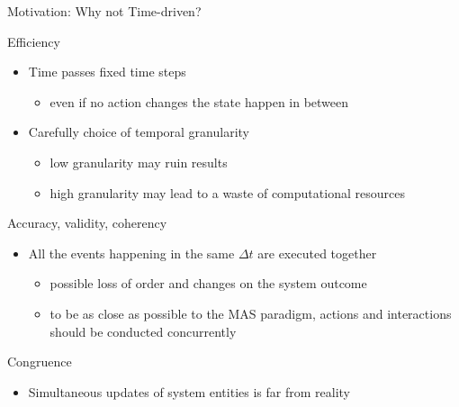 \documentclass[presentation]{beamer} %
\begin{document}
\begin{frame}{Motivation: Why not Time-driven?}

  \begin{block}{Efficiency}
    \begin{itemize}
      	\item Time passes fixed time steps
        \begin{itemize}
          	\item even if no action changes the state happen in between
	\end{itemize}
      	\item Carefully choice of temporal granularity
      	\begin{itemize}
      		\item low granularity may ruin results
		\item high granularity may lead to a waste of computational resources
	\end{itemize}
    \end{itemize}
 \end{block}
  
  \begin{block}{Accuracy, validity, coherency}
    \begin{itemize}
      \item All the events happening in the same $\Delta{}t$ are executed together
        \begin{itemize}
      		\item possible loss of order and changes on the system outcome
		\item to be as close as possible to the MAS paradigm, actions and interactions should be conducted concurrently
	 \end{itemize}
    \end{itemize}
  \end{block}
  
  \begin{block}{Congruence}
    \begin{itemize}
      \item  Simultaneous updates of system entities is far from reality
    \end{itemize}
  \end{block}

\end{frame}
\end{document}
